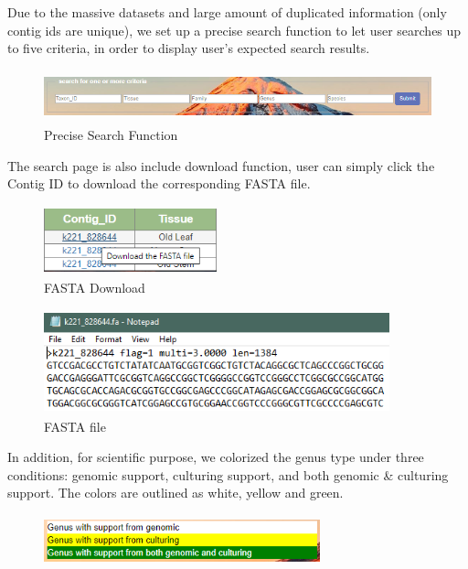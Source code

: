 \documentclass{scrreprt}
\begin{document}
\begin{enumerate}
Due to the massive datasets and large amount of duplicated information (only contig ids are unique), we set up a precise search function to let user searches up to five criteria, in order to display user's expected search results.
\begin{figure}[h!]
    \centering
    \includegraphics[width=15cm,height=1.5cm]{PreciseSearch.PNG}
    \caption{Precise Search Function}
    \label{fig:Start Tour}
\end{figure}
\newline
The search page is also include download function, user can simply click the Contig ID to download the corresponding FASTA file.
\begin{figure}[h!]
    \centering
    \includegraphics[width=5cm,height=2cm]{FastaDownload.PNG}
    \caption{FASTA Download}
    \label{fig:Start Tour}
\end{figure}
\begin{figure}[h!]
    \centering
    \includegraphics[width=10cm,height=3cm]{FastaFile.PNG}
    \caption{FASTA file}
    \label{fig:Start Tour}
\end{figure}
\newline
\newline
\newline
In addition, for scientific purpose, we colorized the genus type under three conditions: genomic support, culturing support, and both genomic \& culturing support. The colors are outlined as white, yellow and green.
\begin{figure}[h!]
    \centering
    \includegraphics[width=8cm,height=1.5cm]{ColorGenus.PNG}

\end{figure}
\end{enumerate}
\end{document}
